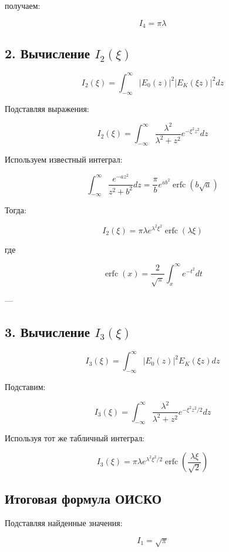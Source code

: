 \documentclass[12pt,a4paper]{article}
\begin{document}
получаем:

\[
I_4=\pi\lambda
\]


\subsection*{2. Вычисление $I_2(\xi)$}

\[
I_2(\xi)=
\int_{-\infty}^{\infty}
|E_0(z)|^2|E_K(\xi z)|^2dz
\]

Подставляя выражения:

\[
I_2(\xi)=
\int_{-\infty}^{\infty}
\frac{\lambda^2}{\lambda^2+z^2}e^{-\xi^2z^2}dz
\]

Используем известный интеграл:

\[
\int_{-\infty}^{\infty}
\frac{e^{-az^2}}{z^2+b^2}dz=
\frac{\pi}{b}e^{ab^2}\operatorname{erfc}(b\sqrt a)
\]

Тогда:

\[
I_2(\xi)=
\pi\lambda
e^{\lambda^2\xi^2}
\operatorname{erfc}(\lambda\xi)
\]

где

\[
\operatorname{erfc}(x)=
\frac{2}{\sqrt{\pi}}
\int_x^\infty e^{-t^2}dt
\]

---


\subsection*{3. Вычисление $I_3(\xi)$}

\[
I_3(\xi)=
\int_{-\infty}^{\infty}
|E_0(z)|^2E_K(\xi z)dz
\]

Подставим:

\[
I_3(\xi)=
\int_{-\infty}^{\infty}
\frac{\lambda^2}{\lambda^2+z^2}
e^{-\xi^2z^2/2}dz
\]

Используя тот же табличный интеграл:

\[
I_3(\xi)=
\pi\lambda
e^{\lambda^2\xi^2/2}
\operatorname{erfc}
\left(
\frac{\lambda\xi}{\sqrt2}
\right)
\]


\subsection*{Итоговая формула ОИСКО}

Подставляя найденные значения:

\[
I_1=\sqrt{\pi}
\]
\end{document}
